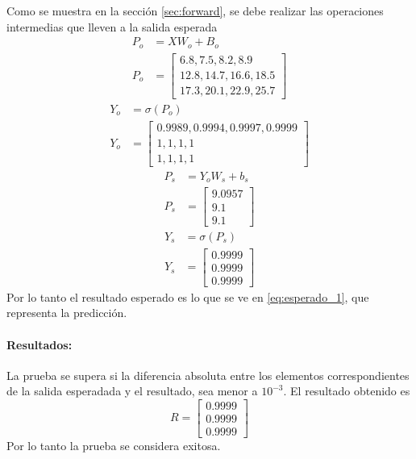 \documentclass[11pt,a4paper]{article}
\begin{document}
Como se muestra en la sección \ref{sec:forward}, se debe realizar las operaciones intermedias que lleven a la salida esperada
\begin{align}
  P_o &= X W_o + B_o \\
  P_o &=
  \begin{bmatrix}
    6.8,  7.5,  8.2,  8.9 \\
    12.8, 14.7, 16.6, 18.5 \\
    17.3, 20.1, 22.9, 25.7
  \end{bmatrix} 
\end{align}
\begin{align}  
  Y_o &= \sigma(P_o) \\
  Y_o &=
  \begin{bmatrix}
    0.9989, 0.9994, 0.9997, 0.9999 \\
    1, 1, 1, 1 \\
    1, 1, 1, 1
  \end{bmatrix} \label{eq:test_Y_o}  
\end{align}
\begin{align}
  P_s &= Y_o W_s + b_s \\
  P_s &= 
  \begin{bmatrix}
    9.0957 \\
    9.1 \\
    9.1
  \end{bmatrix}
\end{align}
\begin{align}
  Y_s &= \sigma(P_s) \\
  Y_s &= 
  \begin{bmatrix}
    0.9999 \\
    0.9999 \\
    0.9999
  \end{bmatrix} \label{eq:esperado_1}
\end{align}  
Por lo tanto el resultado esperado es lo que se ve en \cref{eq:esperado_1}, que representa la predicción.

\paragraph{Resultados:} La prueba se supera si la diferencia absoluta entre los elementos correspondientes de la salida esperadada y el resultado, sea menor a $10^{-3}$. El resultado obtenido es
\begin{equation}
  R = 
  \begin{bmatrix}
    0.9999 \\
    0.9999 \\
    0.9999
  \end{bmatrix}
\end{equation}
Por lo tanto la prueba se considera exitosa.
\end{document}
